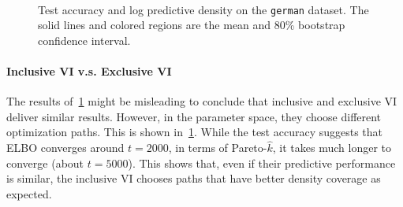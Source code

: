 \begin{figure}[H]
  \vspace{-0.05in}
  \centering
    \\
  \caption{Test accuracy and log predictive density on the \texttt{german} dataset.
    The solid lines and colored regions are the mean and 80\% bootstrap confidence interval.
  }\label{fig:logistic}
  \vspace{-0.05in}
\end{figure}
%
  \vspace{-0.05in}
\paragraph{Inclusive VI v.s. Exclusive VI}
The results of~\cref{fig:logistic} might be misleading to conclude that inclusive and exclusive VI deliver similar results.
However, in the parameter space, they choose different optimization paths.
This is shown in~\cref{fig:logistic}.
While the test accuracy suggests that ELBO converges around \(t=2000\), in terms of Pareto-\(\widehat{k}\), it takes much longer to converge (about \(t=5000\)).
This shows that, even if their predictive performance is similar, the inclusive VI chooses paths that have better density coverage as expected.

